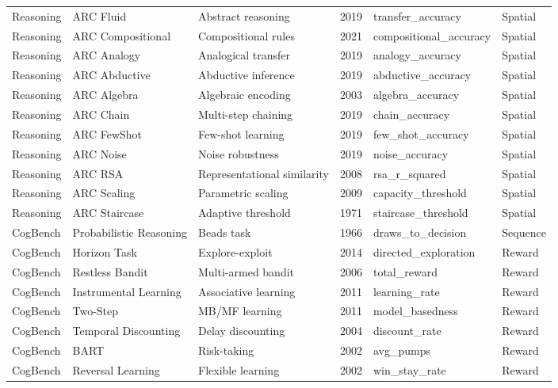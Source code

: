 \documentclass[10pt,landscape]{article}
\begin{document}
\begin{longtable}{@{}p{2.3cm}p{3.0cm}p{4.5cm}p{0.6cm}p{3.8cm}p{1.8cm}@{}}
\midrule
Reasoning & ARC Fluid & Abstract reasoning \citep{chollet2019measure} & 2019 & transfer\_accuracy & Spatial \\
Reasoning & ARC Compositional & Compositional rules & 2021 & compositional\_accuracy & Spatial \\
Reasoning & ARC Analogy & Analogical transfer & 2019 & analogy\_accuracy & Spatial \\
Reasoning & ARC Abductive & Abductive inference & 2019 & abductive\_accuracy & Spatial \\
Reasoning & ARC Algebra & Algebraic encoding & 2003 & algebra\_accuracy & Spatial \\
Reasoning & ARC Chain & Multi-step chaining & 2019 & chain\_accuracy & Spatial \\
Reasoning & ARC FewShot & Few-shot learning & 2019 & few\_shot\_accuracy & Spatial \\
Reasoning & ARC Noise & Noise robustness & 2019 & noise\_accuracy & Spatial \\
Reasoning & ARC RSA & Representational similarity & 2008 & rsa\_r\_squared & Spatial \\
Reasoning & ARC Scaling & Parametric scaling & 2009 & capacity\_threshold & Spatial \\
Reasoning & ARC Staircase & Adaptive threshold & 1971 & staircase\_threshold & Spatial \\

\midrule
CogBench & Probabilistic Reasoning & Beads task & 1966 & draws\_to\_decision & Sequence \\
CogBench & Horizon Task & Explore-exploit & 2014 & directed\_exploration & Reward \\
CogBench & Restless Bandit & Multi-armed bandit & 2006 & total\_reward & Reward \\
CogBench & Instrumental Learning & Associative learning & 2011 & learning\_rate & Reward \\
CogBench & Two-Step & MB/MF learning \citep{daw2011model} & 2011 & model\_basedness & Reward \\
CogBench & Temporal Discounting & Delay discounting & 2004 & discount\_rate & Reward \\
CogBench & BART & Risk-taking \citep{lejuez2002evaluation} & 2002 & avg\_pumps & Reward \\
CogBench & Reversal Learning & Flexible learning \citep{cools2002reversal} & 2002 & win\_stay\_rate & Reward \\


\end{longtable}
\end{document}
